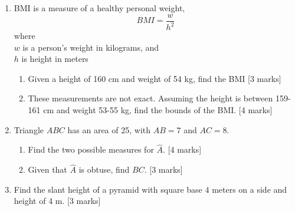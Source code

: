 \documentclass[12pt, twoside]{article}
\begin{document}
\begin{enumerate}
\item BMI is a measure of a healthy personal weight, 
  \[\displaystyle BMI = \frac{w}{h^2}\]
    where \\
    $w$ is a person's weight in kilograms, and \\
    $h$ is height in meters
    \begin{enumerate} 
        \item Given a height of 160 cm and weight of 54 kg, find the BMI  \hfill [3 marks]
        \item These measurements are not exact. Assuming the height is between 159-161 cm and weight 53-55 kg, find the bounds of the BMI.  \hfill [4 marks]
      \end{enumerate}


\item Triangle $ABC$ has an area of 25, with $AB=7$ and $AC=8$. 
   \begin{enumerate}
     \item Find the two possible measures for $\hat{A}$. \hfill [4 marks]
     \item Given that $\hat{A}$ is obtuse, find $BC$. \hfill [3 marks]
   \end{enumerate}

\item Find the slant height of a pyramid with square base 4 meters on a side and height of 4 m. \hfill [3 marks]
    
\end{enumerate}
\end{document}
